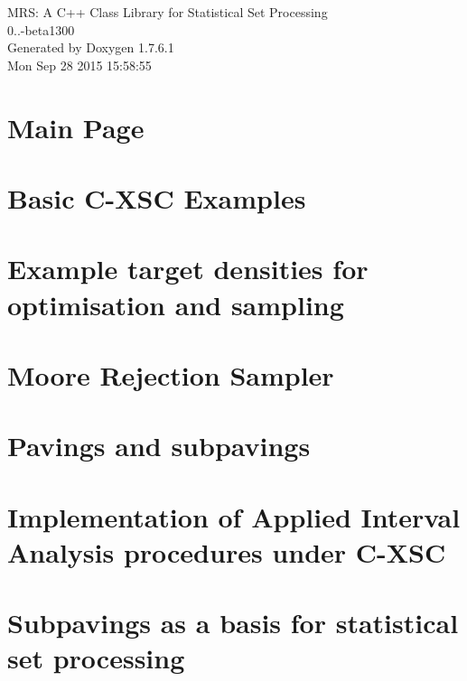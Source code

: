 \documentclass[a4paper]{article}
\begin{document}
\hypersetup{pageanchor=false,citecolor=blue}
\begin{titlepage}
\vspace*{7cm}
\begin{center}
{\Large \-M\-R\-S\-: \-A \-C++ \-Class \-Library for \-Statistical \-Set \-Processing \\[1ex]\large 0..-\/beta1300 }\\
\vspace*{1cm}
{\large \-Generated by Doxygen 1.7.6.1}\\
\vspace*{0.5cm}
{\small Mon Sep 28 2015 15:58:55}\\
\end{center}
\end{titlepage}
\tableofcontents
{}
\hypersetup{pageanchor=true,citecolor=blue}
\section{\-Main \-Page}
\label{index}\hypertarget{index}{}
\section{\-Basic \-C-\/\-X\-S\-C \-Examples}
\label{cxscexamples}
\hypertarget{cxscexamples}{}

\section{\-Example target densities for optimisation and sampling}
\label{target_examples}
\hypertarget{target_examples}{}

\section{\-Moore \-Rejection \-Sampler}
\label{moorerejsam}
\hypertarget{moorerejsam}{}

\section{\-Pavings and subpavings}
\label{pavproc}
\hypertarget{pavproc}{}

\section{\-Implementation of \-Applied \-Interval \-Analysis procedures under \-C-\/\-X\-S\-C}
\label{AIASubPavings}
\hypertarget{AIASubPavings}{}

\section{\-Subpavings as a basis for statistical set processing}
\label{newsubpavings}
\hypertarget{newsubpavings}{}

\end{document}
